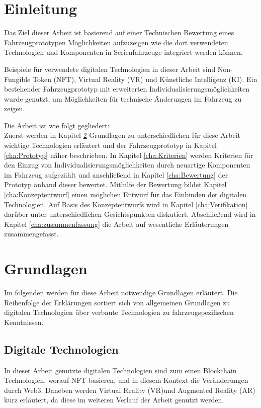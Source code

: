 \chapter{Einleitung}
\label{cha:Einleitung}
Das Ziel dieser Arbeit ist basierend auf einer Technischen Bewertung eines Fahrzeugprototypen Möglichkeiten aufzuzeigen wie die dort verwendeten Technologien und Komponenten in Serienfahrzeuge integriert werden können.

Beispiele für verwendete digitalen Technologien in dieser Arbeit sind Non-Fungible Token (NFT), Virtual Reality (VR) und Künstliche Intelligenz (KI).
Ein bestehender Fahrzeugprototyp mit erweiterten Individualisierungsmöglichkeiten wurde genutzt, um Möglichkeiten für technische Änderungen im Fahrzeug zu zeigen.

Die Arbeit ist wie folgt gegliedert:\\
Zuerst werden in Kapitel \ref{cha:Grundlagen} Grundlagen zu unterschiedlichen für diese Arbeit wichtige Technologien erläutert und der Fahrzeugprototyp in Kapitel \ref{cha:Prototyp} näher beschrieben. In Kapitel \ref{cha:Kriterien} werden Kriterien für den Einzug von Individualisierungsmöglichkeiten durch neuartige Komponenten im Fahrzeug aufgezählt und anschließend in Kapitel \ref{cha:Bewertung} der Prototyp anhand dieser bewertet. Mithilfe der Bewertung bildet Kapitel \ref{cha:Konzeptentwurf} einen möglichen Entwurf für das Einbinden der digitalen Technologien. Auf Basis des Konzeptentwurfs wird in Kapitel \ref{cha:Verifikation} darüber unter unterschiedlichen Gesichtspunkten diskutiert. Abschließend wird in Kapitel \ref{cha:zusammenfassung} die Arbeit auf wesentliche Erläuterungen zusammengefasst.

\chapter{Grundlagen}
\label{cha:Grundlagen}
Im folgenden werden für diese Arbeit notwendige Grundlagen erläutert. Die Reihenfolge der Erklärungen sortiert sich von allgemeinen Grundlagen zu digitalen Technologien über verbaute Technologien zu fahrzeugspezifischen Kenntnissen.
\section{Digitale Technologien}
In dieser Arbeit genutzte digitalen Technologien sind zum einen Blockchain Technologien, worauf NFT basieren, und in diesem Kontext die Veränderungen durch Web3. Daneben werden Virtual Reality (VR)und Augmented Reality (AR) kurz erläutert, da diese im weiteren Verlauf der Arbeit genutzt werden.
